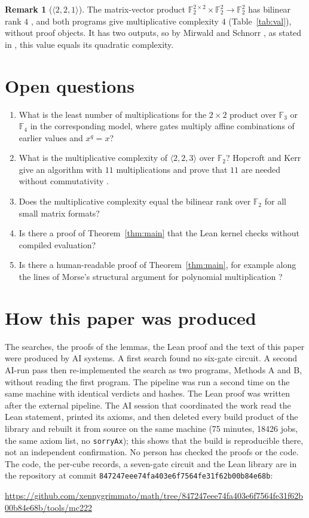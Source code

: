 \documentclass[11pt,a4paper]{article}
\theoremstyle{definition}
\newtheorem{remark}[theorem]{Remark}
\newcommand{\F}{\mathbb{F}}
\newcommand{\code}[1]{\texttt{#1}}
\newcommand{\commit}{847247eee74fa403e6f7564fe31f62b00b84e68b}
\newcommand{\repo}{\url{https://github.com/xennygrimmato/math/tree/847247eee74fa403e6f7564fe31f62b00b84e68b/tools/mc222}}
\begin{document}
\begin{remark}[$\langle2,2,1\rangle$]\label{rem:221}
The matrix-vector product $\F_2^{2\times2}\times\F_2^2\to\F_2^2$ has bilinear rank $4$ \cite{HopcroftKerr71}, and both programs give multiplicative complexity $4$ (Table~\ref{tab:val}), without proof objects. It has two outputs, so by Mirwald and Schnorr \cite{MirwaldSchnorr92}, as stated in \cite[\S2.1]{BoyarFind18}, this value equals its quadratic complexity.
\end{remark}

\section{Open questions}\label{sec:open}

\begin{enumerate}
\item What is the least number of multiplications for the $2\times2$ product over $\F_3$ or $\F_4$ in the corresponding model, where gates multiply affine combinations of earlier values and $x^q=x$?
\item What is the multiplicative complexity of $\langle2,2,3\rangle$ over $\F_2$? Hopcroft and Kerr give an algorithm with $11$ multiplications and prove that $11$ are needed without commutativity \cite{HopcroftKerr71}.
\item Does the multiplicative complexity equal the bilinear rank over $\F_2$ for all small matrix formats?
\item Is there a proof of Theorem~\ref{thm:main} that the Lean kernel checks without compiled evaluation?
\item Is there a human-readable proof of Theorem~\ref{thm:main}, for example along the lines of Morse's structural argument for polynomial multiplication \cite{Morse26}?
\end{enumerate}

\section{How this paper was produced}\label{sec:provenance}

The searches, the proofs of the lemmas, the Lean proof and the text of this paper were produced by AI systems. A first search found no six-gate circuit. A second AI-run pass then re-implemented the search as two programs, Methods A and B, without reading the first program. The pipeline was run a second time on the same machine with identical verdicts and hashes. The Lean proof was written after the external pipeline. The AI session that coordinated the work read the Lean statement, printed its axioms, and then deleted every build product of the library and rebuilt it from source on the same machine (75 minutes, 18426 jobs, the same axiom list, no \code{sorryAx}); this shows that the build is reproducible there, not an independent confirmation. No person has checked the proofs or the code. The code, the per-cube records, a seven-gate circuit and the Lean library are in the repository at commit \code{\commit}:
\begin{center}\footnotesize \repo\end{center}
\end{document}
